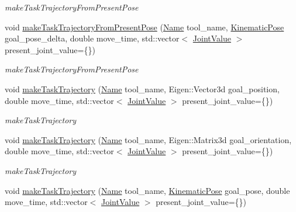 \begin{DoxyCompactItemize}
\begin{DoxyCompactList}\small\item\em make\+Task\+Trajectory\+From\+Present\+Pose \end{DoxyCompactList}\item 
void \hyperlink{classrobotis__manipulator_1_1_robotis_manipulator_ae5b27f917fb52adb0c115f9244f732c9}{make\+Task\+Trajectory\+From\+Present\+Pose} (\hyperlink{namespacerobotis__manipulator_a08c2d25e77a01ad75b9bb740f8ce4765}{Name} tool\+\_\+name, \hyperlink{structrobotis__manipulator_1_1_kinematic_pose}{Kinematic\+Pose} goal\+\_\+pose\+\_\+delta, double move\+\_\+time, std\+::vector$<$ \hyperlink{namespacerobotis__manipulator_aa0556c98c5294ccf3a96c2d0fe315e40}{Joint\+Value} $>$ present\+\_\+joint\+\_\+value=\{\})
\begin{DoxyCompactList}\small\item\em make\+Task\+Trajectory\+From\+Present\+Pose \end{DoxyCompactList}\item 
void \hyperlink{classrobotis__manipulator_1_1_robotis_manipulator_af99e51e771170748507ac7c750b515da}{make\+Task\+Trajectory} (\hyperlink{namespacerobotis__manipulator_a08c2d25e77a01ad75b9bb740f8ce4765}{Name} tool\+\_\+name, Eigen\+::\+Vector3d goal\+\_\+position, double move\+\_\+time, std\+::vector$<$ \hyperlink{namespacerobotis__manipulator_aa0556c98c5294ccf3a96c2d0fe315e40}{Joint\+Value} $>$ present\+\_\+joint\+\_\+value=\{\})
\begin{DoxyCompactList}\small\item\em make\+Task\+Trajectory \end{DoxyCompactList}\item 
void \hyperlink{classrobotis__manipulator_1_1_robotis_manipulator_a4a8e033562c2ec3b10c125d5360216ac}{make\+Task\+Trajectory} (\hyperlink{namespacerobotis__manipulator_a08c2d25e77a01ad75b9bb740f8ce4765}{Name} tool\+\_\+name, Eigen\+::\+Matrix3d goal\+\_\+orientation, double move\+\_\+time, std\+::vector$<$ \hyperlink{namespacerobotis__manipulator_aa0556c98c5294ccf3a96c2d0fe315e40}{Joint\+Value} $>$ present\+\_\+joint\+\_\+value=\{\})
\begin{DoxyCompactList}\small\item\em make\+Task\+Trajectory \end{DoxyCompactList}\item 
void \hyperlink{classrobotis__manipulator_1_1_robotis_manipulator_a80958a2678b01cdfcdf2cf2dcfc1f97d}{make\+Task\+Trajectory} (\hyperlink{namespacerobotis__manipulator_a08c2d25e77a01ad75b9bb740f8ce4765}{Name} tool\+\_\+name, \hyperlink{structrobotis__manipulator_1_1_kinematic_pose}{Kinematic\+Pose} goal\+\_\+pose, double move\+\_\+time, std\+::vector$<$ \hyperlink{namespacerobotis__manipulator_aa0556c98c5294ccf3a96c2d0fe315e40}{Joint\+Value} $>$ present\+\_\+joint\+\_\+value=\{\})

\end{DoxyCompactItemize}
